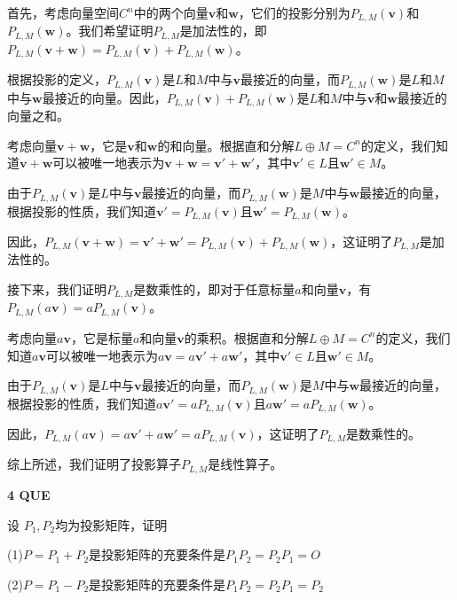 \documentclass[11pt,letterpaper]{ctexart}
\begin{document}
\begin{enumerate}
首先，考虑向量空间$C^n$中的两个向量$\mathbf{v}$和$\mathbf{w}$，它们的投影分别为$P_{L,M}(\mathbf{v})$和$P_{L,M}(\mathbf{w})$。我们希望证明$P_{L,M}$是加法性的，即$P_{L,M}(\mathbf{v} + \mathbf{w}) = P_{L,M}(\mathbf{v}) + P_{L,M}(\mathbf{w})$。

根据投影的定义，$P_{L,M}(\mathbf{v})$是$L$和$M$中与$\mathbf{v}$最接近的向量，而$P_{L,M}(\mathbf{w})$是$L$和$M$中与$\mathbf{w}$最接近的向量。因此，$P_{L,M}(\mathbf{v}) + P_{L,M}(\mathbf{w})$是$L$和$M$中与$\mathbf{v}$和$\mathbf{w}$最接近的向量之和。

考虑向量$\mathbf{v} + \mathbf{w}$，它是$\mathbf{v}$和$\mathbf{w}$的和向量。根据直和分解$L \oplus M = C^n$的定义，我们知道$\mathbf{v} + \mathbf{w}$可以被唯一地表示为$\mathbf{v} + \mathbf{w} = \mathbf{v}' + \mathbf{w}'$，其中$\mathbf{v}' \in L$且$\mathbf{w}' \in M$。

由于$P_{L,M}(\mathbf{v})$是$L$中与$\mathbf{v}$最接近的向量，而$P_{L,M}(\mathbf{w})$是$M$中与$\mathbf{w}$最接近的向量，根据投影的性质，我们知道$\mathbf{v}' = P_{L,M}(\mathbf{v})$且$\mathbf{w}' = P_{L,M}(\mathbf{w})$。

因此，$P_{L,M}(\mathbf{v} + \mathbf{w}) = \mathbf{v}' + \mathbf{w}' = P_{L,M}(\mathbf{v}) + P_{L,M}(\mathbf{w})$，这证明了$P_{L,M}$是加法性的。

接下来，我们证明$P_{L,M}$是数乘性的，即对于任意标量$a$和向量$\mathbf{v}$，有$P_{L,M}(a\mathbf{v}) = aP_{L,M}(\mathbf{v})$。

考虑向量$a\mathbf{v}$，它是标量$a$和向量$\mathbf{v}$的乘积。根据直和分解$L \oplus M = C^n$的定义，我们知道$a\mathbf{v}$可以被唯一地表示为$a\mathbf{v} = a\mathbf{v}' + a\mathbf{w}'$，其中$\mathbf{v}' \in L$且$\mathbf{w}' \in M$。

由于$P_{L,M}(\mathbf{v})$是$L$中与$\mathbf{v}$最接近的向量，而$P_{L,M}(\mathbf{w})$是$M$中与$\mathbf{w}$最接近的向量，根据投影的性质，我们知道$a\mathbf{v}' = aP_{L,M}(\mathbf{v})$且$a\mathbf{w}' = aP_{L,M}(\mathbf{w})$。

因此，$P_{L,M}(a\mathbf{v}) = a\mathbf{v}' + a\mathbf{w}' = aP_{L,M}(\mathbf{v})$，这证明了$P_{L,M}$是数乘性的。

综上所述，我们证明了投影算子$P_{L,M}$是线性算子。

\textbf{4 QUE}
\bigskip

设 $P_1, P_2$均为投影矩阵，证明

(1)$P = P_1 + P_2$是投影矩阵的充要条件是$P_1P_2 = P_2P_1 = O$

(2)$P = P_1 - P_2$是投影矩阵的充要条件是$P_1P_2 = P_2P_1 = P_2$


\end{enumerate}
\end{document}
